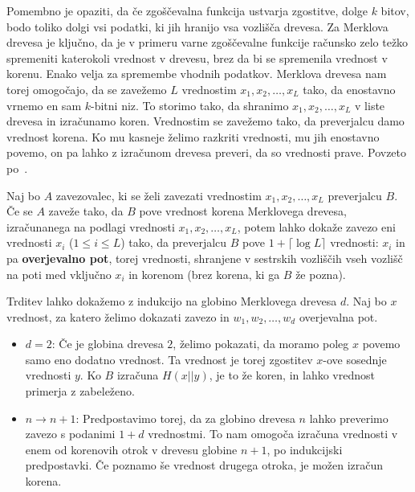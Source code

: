 \documentclass[isrm2, tisk]{fmfdelo}
\begin{document}
Pomembno je opaziti, da če zgoščevalna funkcija ustvarja zgostitve, dolge $k$ bitov, bodo toliko 
dolgi vsi podatki, ki jih hranijo vsa vozlišča drevesa. Za Merklova drevesa je ključno, da je v primeru 
varne zgoščevalne funkcije računsko zelo težko spremeniti katerokoli vrednost v drevesu, brez da bi se 
spremenila vrednost v korenu. Enako velja za spremembe vhodnih podatkov. Merklova drevesa nam torej 
omogočajo, da se zavežemo $L$ vrednostim $x_1, x_2, \dots, x_L$ tako, da enostavno vrnemo en sam 
$k$-bitni niz. To storimo tako, da shranimo $x_1, x_2, \dots, x_L$ v liste drevesa in izračunamo koren. 
Vrednostim se zavežemo tako, da preverjalcu damo vrednost korena. Ko mu kasneje želimo razkriti vrednosti, 
mu jih enostavno povemo, on pa lahko z izračunom drevesa preveri, da so vrednosti prave. Povzeto 
po~\cite{micali2000csproofs}.

\begin{trditev}
\label{trd:overjevalna_pot}
    Naj bo $A$ zavezovalec, ki se želi zavezati vrednostim $x_1, x_2, \dots, x_L$ preverjalcu $B$. Če 
    se $A$ zaveže tako, da $B$ pove vrednost korena Merklovega drevesa, izračunanega na podlagi 
    vrednosti $x_1, x_2, \dots, x_L$, potem lahko dokaže zavezo eni vrednosti $x_i$ ($1 \le i \le L$)
    tako, da preverjalcu $B$ pove $1 + \lceil \log L \rceil$ vrednosti: $x_i$ in pa \textbf{overjevalno 
    pot}, torej vrednosti, shranjene v sestrskih vozliščih vseh vozlišč na poti med vključno $x_i$ in 
    korenom (brez korena, ki ga $B$ že pozna).
\end{trditev}

\begin{dokaz}
    Trditev lahko dokažemo z indukcijo na globino Merklovega drevesa $d$. Naj bo $x$ vrednost, za katero
    želimo dokazati zavezo in $w_1, w_2, \dots, w_d$ overjevalna pot.
    \begin{itemize}
        \item $d = 2$: Če je globina drevesa $2$, želimo pokazati, da moramo poleg $x$ povemo samo eno  
            dodatno vrednost. Ta vrednost je torej zgostitev $x$-ove sosednje vrednosti $y$. Ko $B$ izračuna
            $H(x || y)$, je to že koren, in lahko vrednost primerja z zabeleženo.
        \item $n \rightarrow n + 1$: Predpostavimo torej, da za globino drevesa $n$ lahko preverimo zavezo s 
            podanimi $1 + d$ vrednostmi. To nam omogoča izračuna vrednosti v enem od korenovih otrok v 
            drevesu globine $n + 1$, po indukcijski predpostavki. Če poznamo še vrednost drugega otroka, je 
            možen izračun korena.
    \end{itemize}
\end{dokaz}
\end{document}
